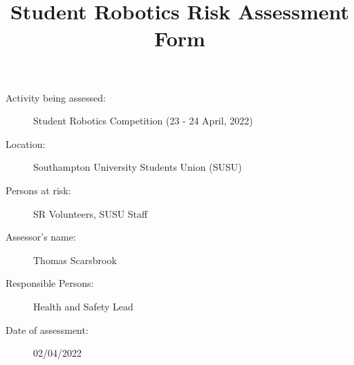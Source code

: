 \documentclass[12pt,a4paper]{scrartcl}
\title{Student Robotics Risk Assessment Form}
\begin{document}
\maketitle

\begin{description}
\item[Activity being assessed:] Student Robotics Competition (23 - 24 April, 2022)
\item[Location:] Southampton University Students Union (SUSU)
\item[Persons at risk:] SR Volunteers, SUSU Staff
\end{description}

\begin{description}
\item[Assessor's name:] Thomas Scarsbrook
\item[Responsible Persons:] Health and Safety Lead
\item[Date of assessment:] 02/04/2022
\end{description}
\clearpage

\newcommand{\risk}[4]{
 #1 & #2 & #3 & #4 \\
}
\end{document}
